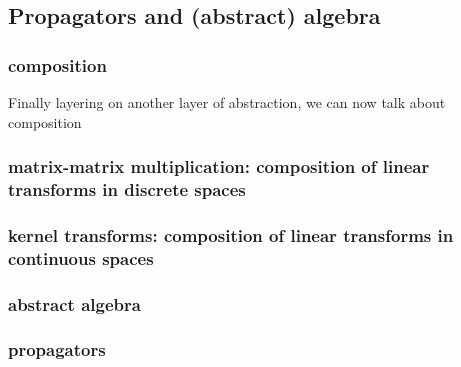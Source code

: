 \documentclass[a4paper,twoside]{article}
\newtheorem{theorem}{Theorem}
\newtheorem{corollary}{Corollary}[theorem]
\newtheorem{definition}{Definition} %
\begin{document}
\subsection{Propagators and (abstract) algebra}
\subsubsection{composition}
Finally layering on another layer of abstraction, we can now talk about composition
\subsubsection{matrix-matrix multiplication: composition of linear transforms in discrete spaces}
\subsubsection{kernel transforms: composition of linear transforms in continuous spaces}
\subsubsection{abstract algebra}
\subsubsection{propagators}




% 

% 
% 

 

\printbibliography      %
\end{document}
